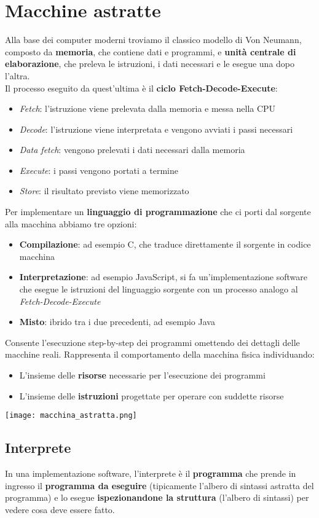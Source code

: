 \newpage
\section{Macchine astratte}
Alla base dei computer moderni troviamo il classico modello di Von Neumann, composto da \textbf{memoria}, che contiene dati e programmi, e \textbf{unità centrale di elaborazione}, che preleva le istruzioni, i dati necessari e le esegue una dopo l'altra. \\
Il processo eseguito da quest'ultima è il \textbf{ciclo Fetch-Decode-Execute}:
\begin{itemize}
	\item \textit{Fetch}: l'istruzione viene prelevata dalla memoria e messa nella CPU
	\item \textit{Decode}: l'istruzione viene interpretata e vengono avviati i passi necessari
	\item \textit{Data fetch}: vengono prelevati i dati necessari dalla memoria
	\item  \textit{Execute}: i passi vengono portati a termine
	\item \textit{Store}: il risultato previsto viene memorizzato
\end{itemize} 
Per implementare un \textbf{linguaggio di programmazione} che ci porti dal sorgente alla macchina abbiamo tre opzioni:
\begin{itemize}
	\item \textbf{Compilazione}: ad esempio C, che traduce direttamente il sorgente in codice macchina
	\item  \textbf{Interpretazione}: ad esempio JavaScript, si fa un'implementazione software che esegue le istruzioni del linguaggio sorgente con un processo analogo al \textit{Fetch-Decode-Execute}
	\item  \textbf{Misto}: ibrido tra i due precedenti, ad esempio Java
\end{itemize}

\begin{definition}
	Consente l'esecuzione step-by-step dei programmi omettendo dei dettagli delle macchine reali. Rappresenta il comportamento della macchina fisica individuando:
	\begin{itemize}
		\item L'insieme delle \textbf{risorse} necessarie per l'esecuzione dei programmi
		\item L'insieme delle \textbf{istruzioni} progettate per operare con suddette risorse
	\end{itemize}
	\centering\texttt{[image: macchina\_astratta.png]}
\end{definition}
\subsection{Interprete}
In una implementazione software, l'interprete è il \textbf{programma} che prende in ingresso il \textbf{programma da eseguire} (tipicamente l'albero di sintassi astratta del programma) e lo esegue \textbf{ispezionandone la struttura} (l'albero di sintassi) per vedere cosa deve essere fatto. 